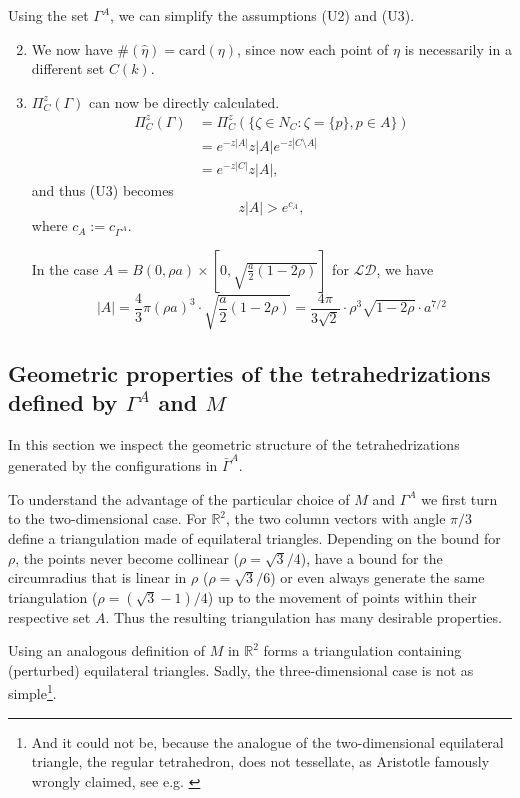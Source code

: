 \begin{remark}\label{r:UA}
	Using the set $\Gamma^A$, we can simplify the assumptions (U2) and (U3).
\begin{enumerate}[(U1)]	
	\setcounter{enumi}{1}
	\item	We now have  $\#(\hat\eta) = \mathrm{card}(\eta)$, since now each point of $\eta$ is necessarily in a different set $C(k)$.

\item $\Pi^z_C(\Gamma)$ can now be directly calculated.
	\begin{align*} 
		\Pi^z_C(\Gamma) &= \Pi^z_C(\{\zeta \in N_C: \zeta = \{p\}, p \in A\}) \\
		& = e^{-z|A|} z |A| e^{-z|C\setminus A|} \\
		& = e^{-z|C|} z |A|,
	\end{align*}
	and thus (U3) becomes
	$$z|A| > e^{c_{A}},$$
	where $c_A := c_{\Gamma^A}$.

	In  the case $A = B(0,\rho a)\times [0, \sqrt{\frac a2(1-2\rho)}]$ for $\mathcal {LD}$, we have
	$$|A| = \frac 43 \pi (\rho a)^3 \cdot \sqrt{\frac a2(1-2\rho)} = \frac {4\pi}{3\sqrt{2}}\cdot  \rho^3 \sqrt{1-2\rho} \cdot a^{7/2}$$

\end{enumerate}
\end{remark}


\subsection{Geometric properties of the tetrahedrizations defined by $\Gamma^A$ and $M$}
In this section we inspect the geometric structure of the tetrahedrizations generated by the configurations in $\bar \Gamma^A$.

To understand the advantage of the particular choice of $M$ and $\Gamma^A$ we first turn to the two-dimensional case. For $\mathbb R^2$, the two column vectors with angle $\pi/3$ define a triangulation made of equilateral triangles. Depending on the bound for $\rho$, the points never become collinear ($\rho = \sqrt 3/4$), have a bound for the circumradius that is linear in $\rho$ ($\rho = \sqrt 3/6$) or even always generate the same triangulation ($\rho = (\sqrt 3 - 1)/4$) up to the movement of points within their respective set $A$. Thus the resulting triangulation has many desirable properties. \newline

Using an analogous definition of $M$ in $\mathbb R^2$ forms a triangulation containing (perturbed) equilateral triangles. Sadly, the three-dimensional case is not as simple\footnote{And it could not be, because the analogue of the two-dimensional equilateral triangle, the regular tetrahedron, does not tessellate, as Aristotle famously wrongly claimed, see e.g. \cite{Lagarias12}}.

